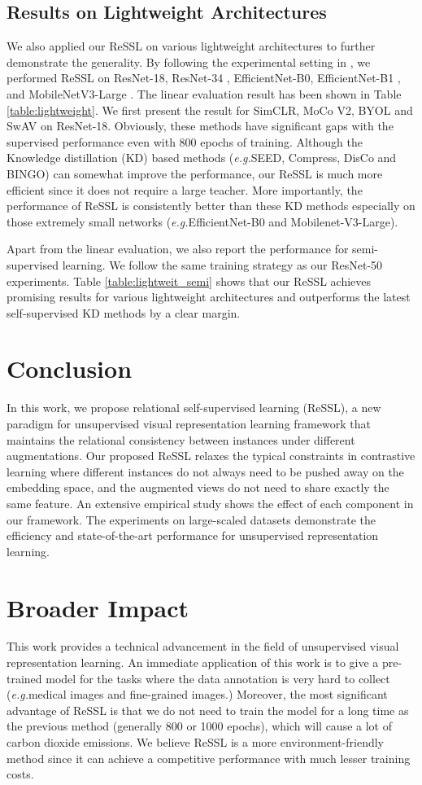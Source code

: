 \documentclass{article}
\newcommand{\<}{\left\langle}
\renewcommand{\>}{\right\rangle}
\newcommand{\eg}{{\emph{e.g.}}}
\begin{document}
\subsection{Results on Lightweight Architectures}
We also applied our ReSSL on various lightweight architectures to further demonstrate the generality. By following the experimental setting in \cite{seed, disco}, we performed ReSSL on ResNet-18, ResNet-34 \cite{resnet}, EfficientNet-B0, EfficientNet-B1 \cite{efficientnet}, and MobileNetV3-Large \cite{mbv3}. The linear evaluation result has been shown in  Table \ref{table:lightweight}. We first present the result for SimCLR, MoCo V2, BYOL and SwAV on ResNet-18. Obviously, these methods have significant gaps with the supervised performance even with 800 epochs of training. Although the Knowledge distillation (KD) based methods (\eg SEED, Compress, DisCo and BINGO) can somewhat improve the performance, our ReSSL is much more efficient since it does not require a large teacher. More importantly, the performance of ReSSL is consistently better than these KD methods especially on those extremely small networks (\eg EfficientNet-B0 and Mobilenet-V3-Large). 

Apart from the linear evaluation, we also report the performance for semi-supervised learning. We follow the same training strategy as our ResNet-50 experiments. Table \ref{table:lightweit_semi} shows that our ReSSL achieves promising results for various lightweight architectures and outperforms the latest self-supervised KD methods by a clear margin.  \section{Conclusion}

In this work, we propose relational self-supervised learning (ReSSL), a new paradigm for unsupervised visual representation learning framework that maintains the relational consistency between instances under different augmentations. Our proposed ReSSL relaxes the typical constraints in contrastive learning where different instances do not always need to be pushed away on the embedding space, and the augmented views do not need to share exactly the same feature. An extensive empirical study shows the effect of each component in our framework. The experiments on large-scaled datasets demonstrate the efficiency and state-of-the-art performance for unsupervised representation learning. 
\section*{Broader Impact}
This work provides a technical advancement in the field of unsupervised visual representation learning. An immediate application of this work is to give a pre-trained model for the tasks where the data annotation is very hard to collect (\eg medical images and fine-grained images.) Moreover, the most significant advantage of ReSSL is that we do not need to train the model for a long time as the previous method (generally 800 or 1000 epochs), which will cause a lot of carbon dioxide emissions. We believe ReSSL is a more environment-friendly method since it can achieve a competitive performance with much lesser training costs.
\end{document}
